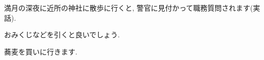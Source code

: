 \showanswersection
\showanswersubsection
\begin{showanswer}{1.1}
満月の深夜に近所の神社に散歩に行くと, 警官に見付かって職務質問されます(実話).
\end{showanswer}
\begin{showanswer}{1.2}
おみくじなどを引くと良いでしょう.
\end{showanswer}
\showanswersubsection
\begin{showanswer}{2.1}
蕎麦を買いに行きます.
\end{showanswer}
